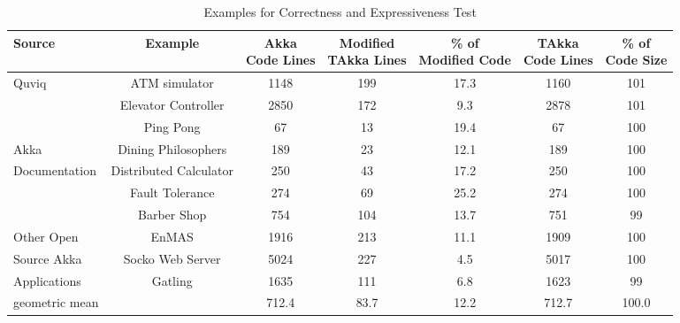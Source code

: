 \begin{table}[h]
\label{express}
\caption{Examples for Correctness and Expressiveness Test}
  \begin{adjustwidth}{-1.8cm}{}
\begin{tabular}{| l | c | c | c |  c | c | c |}
\hline

Source & Example & \specialcell{Akka\\ Code Lines} &
\specialcell{Modified\\ TAkka Lines} & \specialcell{\% of \\Modified Code} &
\specialcell{TAkka\\Code Lines}
& \specialcell{\% of \\Code Size} \\
\hline
Quviq\cite{quviq}  & ATM simulator & 1148 & 199 & 17.3 & 1160 & 101 \\
\cline{2-7}
                   & Elevator Controller &
2850 & 172 & 9.3 & 2878 & 101 \\
\hline


                   & Ping Pong & 67 & 13 & 19.4 & 67 & 100 \\
\cline{2-7}
Akka   & Dining Philosophers &
189 & 23 & 12.1 &
189 & 100  \\
\cline{2-7}
Documentation\cite{akka_doc}  & Distributed Calculator  & 250 &
43 & 17.2 & 250 & 100 \\
\cline{2-7}
                                   & Fault Tolerance & 274 & 69 & 25.2 & 274 &
100 \\
\hline

                                   & Barber Shop\cite{BarberShop} & 754 & 104 &
13.7 & 751 & 99 \\
\cline{2-7}
Other Open & EnMAS \cite{EnMAS} & 1916 & 213
& 11.1 & 1909 &
100 \\
\cline{2-7}
Source Akka        & Socko Web Server \cite{SOCKO} & 5024 & 227
& 4.5 & 5017 & 100 \\
\cline{2-7}
Applications                                          & Gatling \cite{Gatling} 
& 1635 & 111 & 6.8 & 1623 & 99\\
\hline
geometric mean                   & & 712.4 & 83.7 & 12.2 & 712.7 & 100.0 \\
\hline
\end{tabular}
  \end{adjustwidth}
\end{table}




